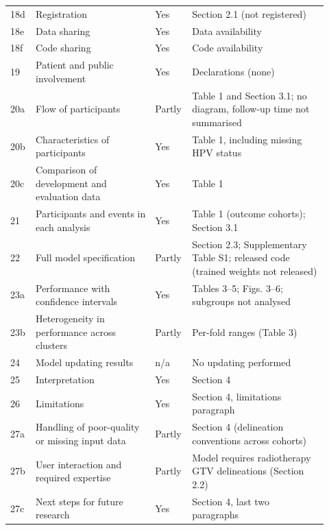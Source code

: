 \begin{longtable}{@{}L{0.06\linewidth}L{0.36\linewidth}L{0.08\linewidth}L{0.415\linewidth}@{}}
18d & Registration & Yes & Section 2.1 (not registered) \\
18e & Data sharing & Yes & Data availability \\
18f & Code sharing & Yes & Code availability \\
19 & Patient and public involvement & Yes & Declarations (none) \\
20a & Flow of participants & Partly & Table 1 and Section 3.1; no diagram, follow-up time not summarised \\
20b & Characteristics of participants & Yes & Table 1, including missing HPV status \\
20c & Comparison of development and evaluation data & Yes & Table 1 \\
21 & Participants and events in each analysis & Yes & Table 1 (outcome cohorts); Section 3.1 \\
22 & Full model specification & Partly & Section 2.3; Supplementary Table S1; released code (trained weights not released) \\
23a & Performance with confidence intervals & Yes & Tables 3--5; Figs. 3--6; subgroups not analysed \\
23b & Heterogeneity in performance across clusters & Partly & Per-fold ranges (Table 3) \\
24 & Model updating results & n/a & No updating performed \\
25 & Interpretation & Yes & Section 4 \\
26 & Limitations & Yes & Section 4, limitations paragraph \\
27a & Handling of poor-quality or missing input data & Partly & Section 4 (delineation conventions across cohorts) \\
27b & User interaction and required expertise & Partly & Model requires radiotherapy GTV delineations (Section 2.2) \\
27c & Next steps for future research & Yes & Section 4, last two paragraphs \\
\end{longtable}

